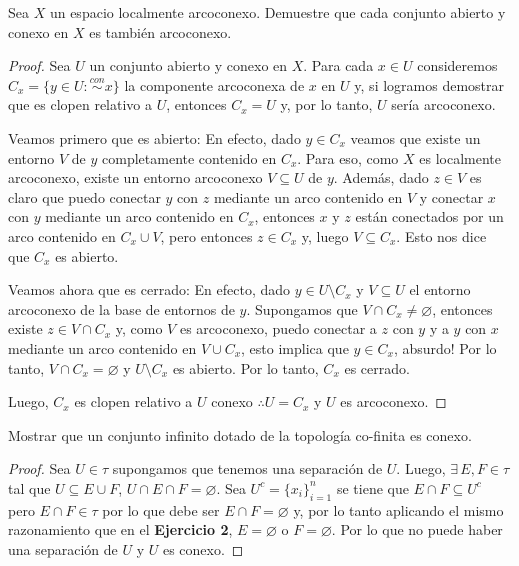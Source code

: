 \documentclass{article}
\theoremstyle{definition}
\newenvironment{ejercicio}[1]{\begin{trivlist}
\item[\hskip \labelsep {\bfseries Ejercicio}\hskip \labelsep {\bfseries #1.}]}{\end{trivlist}}
\begin{document}
\begin{ejercicio}{10}
    Sea \(X\) un espacio localmente arcoconexo. Demuestre que cada conjunto abierto y conexo en \(X\) es también arcoconexo.
\end{ejercicio}
\begin{proof}
    Sea \( U \) un conjunto abierto y conexo en \( X \). Para cada \( x \in U \) consideremos \( C_x = \{ y \in U : \overset{con}{\sim} x \} \) la componente arcoconexa de \( x \) en \( U \) y, si logramos demostrar que es clopen relativo a \( U \), entonces \( C_x = U \) y, por lo tanto, \( U \) sería arcoconexo.

    Veamos primero que es abierto: En efecto, dado \( y \in C_x \) veamos que existe un entorno \( V \) de \( y \)
    completamente contenido en \( C_x \). Para eso, como \( X \) es localmente arcoconexo, existe un entorno arcoconexo \( V \subseteq U \) de \( y \).
    Además, dado \( z \in V \) es claro que puedo conectar \( y \) con \( z \) mediante un arco contenido en \( V \) y conectar
    \( x \) con \( y \) mediante un arco contenido en \( C_x \), entonces \( x \) y \( z \) están conectados por un arco contenido en \( C_x \cup V \), pero entonces \( z \in C_x \) y, luego \( V \subseteq C_x \).
    Esto nos dice que \( C_x \) es abierto.

    Veamos ahora que es cerrado: En efecto, dado \( y \in U \setminus C_x \) y \( V \subseteq U \) el entorno arcoconexo de la base de entornos de \( y \).
    Supongamos que \( V \cap C_x \neq \varnothing \), entonces existe \( z \in V \cap C_x \) y, como \( V \) es arcoconexo,
    puedo conectar a \( z \) con \( y \) y a \( y \) con \( x \) mediante un arco contenido en \( V \cup C_x \), esto implica que \( y \in C_x \), absurdo! Por lo tanto,
    \( V \cap C_x = \varnothing \) y \( U \setminus C_x \) es abierto. Por lo tanto, \( C_x \) es cerrado.

    Luego, \( C_x \) es clopen relativo a \( U \) conexo \( \therefore U = C_x \) y \( U \) es arcoconexo.
\end{proof}

\begin{ejercicio}{11}
    Mostrar que un conjunto infinito dotado de la topología co-finita es conexo.
\end{ejercicio}
\begin{proof}
    Sea \( U \in \tau \) supongamos que tenemos una separación de \( U \). Luego, \( \exists \, E, F \in \tau \) tal que
    \( U \subseteq E \cup F \), \( U \cap E \cap F = \varnothing \). Sea \( U^c = {\{ x_i \}}_{i=1}^n \) se tiene que \( E \cap F \subseteq U^c \) pero \( E \cap F \in \tau \) por lo que
    debe ser \( E \cap F = \varnothing \) y, por lo tanto aplicando el mismo razonamiento que en el \textbf{Ejercicio 2}, \( E = \varnothing \) o \( F = \varnothing \). Por lo que no
    puede haber una separación de \( U \) y \( U \) es conexo.
\end{proof}
\end{document}
